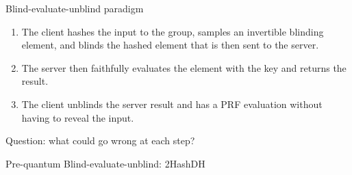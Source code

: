 \documentclass[aspectratio=169, 12pt,handout]{beamer}
\begin{document}
\begin{frame}{Blind-evaluate-unblind paradigm}
  \begin{enumerate}
    \item The client hashes the input to the group, samples an invertible blinding
      element, and blinds the hashed element that is then sent to the server.\pause
    \item The server then faithfully evaluates the element with the key and
      returns the result.\pause
    \item The client unblinds the server result and has a PRF evaluation without
      having to reveal the input.\pause
  \end{enumerate}

  \hfill \alert{Question:} what could go wrong at each step?
\end{frame}

\begin{frame}{Pre-quantum Blind-evaluate-unblind: 2HashDH}
  \vspace{-2em}

\end{frame}
\end{document}
